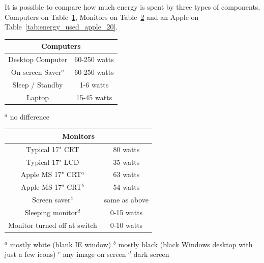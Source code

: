     It is possible to compare how much energy is spent by three types of components, Computers on Table~\ref{tab:energy_used_computer}, Monitors on Table~\ref{tab:energy_used_monitor} and an Apple on Table~\ref{tab:energy_used_apple_20}.
    \begin{table}
        \centering
        \begin{tabular}{|c|c|}
        \hline
        \multicolumn{ 2}{|c|}{{\bf Computers}} \\
        \hline
        Desktop Computer & 60-250 watts \\
        \hline
        On screen Saver$^a$ & 60-250 watts \\
        \hline
        Sleep / Standby & 1-6 watts \\
        \hline
        Laptop & 15-45 watts \\
        \hline
        \end{tabular}\linebreak
        $^a$ no difference
        \label{tab:energy_used_computer}
    \end{table}
    \begin{table}
        \centering
        \begin{tabular}{|c|c|}
        \hline
        \multicolumn{ 2}{|c|}{{\bf Monitors}} \\
        \hline
        Typical 17" CRT &   80 watts \\
        \hline
        Typical 17" LCD &   35 watts \\
        \hline
        Apple MS 17" CRT$^a$ &   63 watts \\
        \hline
        Apple MS 17" CRT$^b$ &   54 watts \\
        \hline
        Screen saver$^c$ & same as above \\
        \hline
        Sleeping monitor$^d$ & 0-15 watts \\
        \hline
        Monitor turned off at switch & 0-10 watts \\
        \hline
        \end{tabular}  \linebreak
        $^a$ mostly white (blank IE window) \linebreak
        $^b$ mostly black (black Windows desktop with just a few icons)\linebreak
        $^c$ any image on screen\linebreak
        $^d$ dark screen
        \label{tab:energy_used_monitor}
    \end{table}
